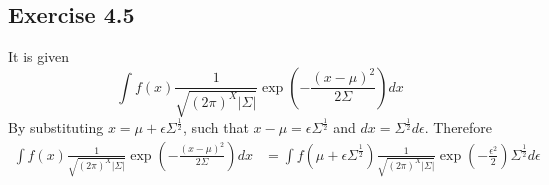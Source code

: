 \documentclass[fleqn]{article}
\begin{document}
\subsection*{Exercise 4.5}
It is given
\begin{equation}
    \int f(x) \frac{1}{\sqrt{(2 \pi)^X |\Sigma|}} \exp\left({-\frac{(x - \mu)^2}{2\Sigma}}\right) dx
\end{equation}
By substituting $x = \mu + \epsilon \Sigma^{\frac{1}{2}}$, such that $x - \mu = \epsilon \Sigma^{\frac{1}{2}}$ and $dx = \Sigma^{\frac{1}{2}} d\epsilon$. Therefore
\begin{equation}
    \begin{split}
        \int f(x) \frac{1}{\sqrt{(2 \pi)^X |\Sigma|}} \exp\left({-\frac{(x - \mu)^2}{2\Sigma}}\right) dx & =
        \int f(\mu + \epsilon \Sigma^{\frac{1}{2}}) \frac{1}{\sqrt{(2 \pi)^X |\Sigma|}} \exp \left(- \frac{\epsilon^2}{2}\right) \Sigma^{\frac{1}{2}} d\epsilon
    \end{split}
\end{equation}
\end{document}
